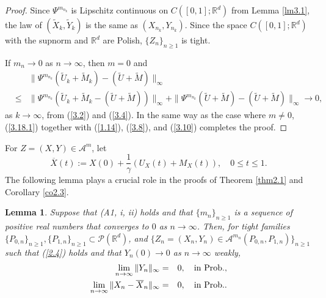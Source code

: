 \documentclass[12pt]{article}
\newtheorem{lemma}{Lemma}[section]
\begin{document}
\begin{proof}
Since $\Psi^{m_{n_k}}$ is Lipschitz continuous on $C([0,1];\mathbb{R}^d)$ from Lemma \ref{lm3.1},
the law of $(\tilde X_{k},\tilde Y_{k})$ is the same as $(X_{n_k}, Y_{n_k})$. 
Since  the space $C([0,1];\mathbb{R}^d)$ with the supnorm and $\mathbb{R}^d$ are Polish,
$\{Z_n\}_{n\ge 1}$ is tight. 

If $m_n\to 0$ as $n\to\infty$, then $m=0$ and
\begin{eqnarray}\label{3.18.1}
&&\|\Psi^{m_{n_k}}(\tilde U_{k}+\tilde M_{k})-(\tilde U+\tilde M)\|_\infty\\
& \le& \|\Psi^{m_{n_k}}(\tilde U_{k}+\tilde M_{k}-(\tilde U+\tilde M))\|_\infty
+
\|\Psi^{m_{n_k}}(\tilde U+\tilde M)-(\tilde U+\tilde M)\|_\infty\to 0,\nonumber
\end{eqnarray}
as $k\to\infty$, from (\ref{3.2}) and (\ref{3.4}).
In the same way as the case where $m\ne 0$,
(\ref{3.18.1}) together with (\ref{1.14}), (\ref{3.8}), and (\ref{3.10}) completes the proof.
\end{proof}

For $Z=(X,Y)\in \mathcal{A}^{m}$, let
\begin{equation}\label{3.19.0}
\overline X(t):=X(0)+\frac{1}{\gamma}(U_X(t)+M_X(t)),\quad 0\le t\le 1.
\end{equation}
The following lemma plays a crucial role  in the proofs of Theorem \ref{thm2.1} and Corollary \ref{co2.3}.

\begin{lemma}\label{lm3.4}
Suppose that (A1, i, ii) holds and that $\{m_n\}_{n\ge 1}$ is a sequence of positive real numbers 
that converges to $0$ as $n\to\infty$.
Then, for tight families $\{P_{0,n}\}_{n\ge 1}, \{P_{1,n}\}_{n\ge 1}\subset\mathcal{P}(\mathbb{R}^d)$,
 and $\{Z_n=(X_n, Y_n)\in\mathcal{A}^{m_n}(P_{0,n},P_{1,n})\}_{n\ge 1}$ such that (\ref{2.4}) holds
 and that $Y_n(0)\to 0$ as $n\to\infty$ weakly,
\begin{eqnarray}
\lim_{n\to\infty}\|Y_n\|_\infty&=&0,\quad {\rm in\hbox{ }Prob.},\label{3.19}\\
\lim_{n\to\infty}\|X_{n}-\overline X_{n}\|_\infty&=&0, \quad {\rm in\hbox{ }Prob.}.\label{3.20}
\end{eqnarray}
\end{lemma}
\end{document}

